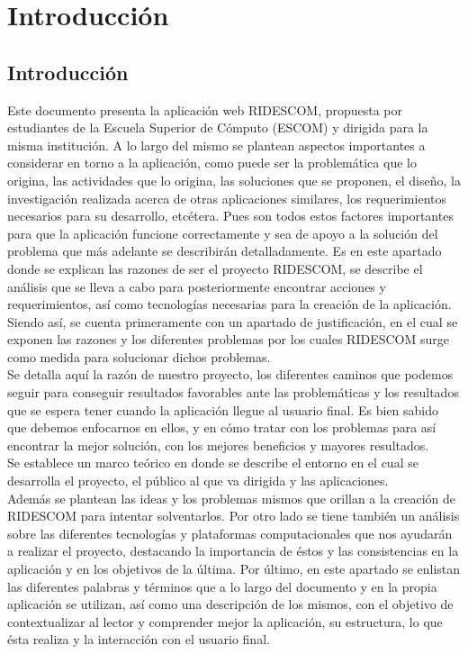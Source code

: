 \chapter{Introducción}
	\section{Introducci\'on}
	
	\noindent Este documento presenta la aplicación web RIDESCOM, propuesta por estudiantes de la Escuela Superior de Cómputo (ESCOM) y dirigida para la misma institución. A lo largo del mismo se plantean aspectos importantes a considerar en torno a la aplicación, como puede ser la problemática que lo origina, las actividades que lo origina, las soluciones que se proponen, el diseño, la investigación realizada acerca de otras aplicaciones similares, los requerimientos necesarios para su desarrollo, etcétera. Pues son todos estos factores importantes para que la aplicación funcione correctamente y sea de apoyo a la solución del problema que más adelante se describirán detalladamente. Es en este apartado donde se explican las razones de ser el proyecto RIDESCOM, se describe el análisis que se lleva a cabo para posteriormente encontrar acciones y requerimientos, así como tecnologías necesarias para la creación de la aplicación. 
	Siendo así, se cuenta primeramente con un apartado de justificación, en el cual se exponen las razones y los diferentes problemas por los cuales RIDESCOM surge como medida para solucionar dichos problemas.\\
	Se detalla aquí la razón de nuestro proyecto, los diferentes caminos que podemos seguir para conseguir resultados favorables ante las problemáticas y los resultados que se espera tener cuando la aplicación llegue al usuario final. Es bien sabido que debemos enfocarnos en ellos, y en cómo tratar con los problemas para así encontrar la mejor solución, con los mejores beneficios y mayores resultados.\\
	Se establece un marco teórico en donde se describe el entorno en el cual se desarrolla el proyecto, el público al que va dirigida y las aplicaciones.\\
	Además se plantean las ideas y los problemas mismos que orillan a la creación de RIDESCOM para intentar solventarlos. Por otro lado se tiene también un análisis sobre las diferentes tecnologías y plataformas computacionales que nos ayudarán a realizar el proyecto, destacando la importancia de éstos y las consistencias en la aplicación y en los objetivos de la última. Por último, en este apartado se enlistan las diferentes palabras y términos que a lo largo del documento y en la propia aplicación se utilizan, así como una descripción de los mismos, con el objetivo de contextualizar al lector y comprender mejor la aplicación, su estructura, lo que ésta realiza y la interacción con el usuario final.\\
